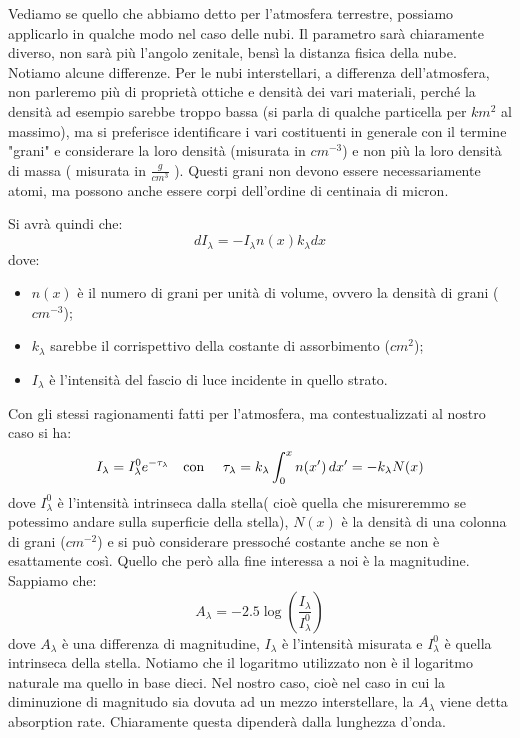 \documentclass[a4paper,11pt]{article}
\begin{document}
    Vediamo se quello che abbiamo detto per l'atmosfera terrestre, possiamo applicarlo in qualche modo nel caso delle nubi. Il parametro sarà chiaramente diverso, non sarà più l'angolo zenitale, bensì la distanza fisica della nube. 
    Notiamo alcune differenze. Per le nubi interstellari, a differenza dell'atmosfera, non parleremo più di proprietà ottiche e densità dei vari materiali, perché la densità ad esempio sarebbe troppo bassa (si parla di qualche particella per $km^2$ al massimo), ma si preferisce identificare i vari costituenti in generale con il termine "grani" e considerare la loro densità (misurata in $cm^{-3}$) e non più la loro densità di massa ( misurata in $ \frac{g}{cm^3} $ ). Questi grani non devono essere necessariamente atomi, ma possono anche essere corpi dell'ordine di centinaia di micron.
    
    Si avrà quindi che:
    $$
        dI_{\lambda} = -I_{\lambda} n(x) k_{\lambda} dx
    $$
    dove:
    \begin{itemize}
        \item $n(x)$ è il numero di grani per unità di volume, ovvero la densità di grani ($cm^{-3}$);
        \item $k_{\lambda}$ sarebbe il corrispettivo della costante di assorbimento ($cm^2$);
        \item $I_{\lambda}$ è l'intensità del fascio di luce incidente in quello strato.
    \end{itemize}
    
    Con gli stessi ragionamenti fatti per l'atmosfera, ma contestualizzati al nostro caso si ha:
    $$
        I_{\lambda} = I_{\lambda}^0 e^{-\tau_{\lambda}} \quad \hbox{con } \quad  \tau_{\lambda} = k_{\lambda} \int_0^x n(x') \, dx' = - k_{\lambda} N(x)
    $$
    dove $I_{\lambda}^0$ è l'intensità intrinseca dalla stella( cioè quella che misureremmo se potessimo andare sulla superficie della stella),  $N(x)$ è la densità di una colonna di grani ($cm^{-2}$) e si può considerare pressoché costante anche se non è esattamente così. Quello che però alla fine interessa a noi è la magnitudine. Sappiamo che: 
    $$
        A_{\lambda} = -2.5 \log \left( \frac{I_{\lambda}}{I_{\lambda}^0 } \right)
    $$
    dove $A_{\lambda}$ è una differenza di magnitudine, $I_{\lambda}$ è l'intensità misurata e $I_{\lambda}^0$ è quella intrinseca della stella. Notiamo che il logaritmo utilizzato non è il logaritmo naturale ma quello in base dieci. Nel nostro caso, cioè nel caso in cui la diminuzione di magnitudo sia dovuta ad un mezzo interstellare, la $A_{\lambda}$ viene detta absorption rate. Chiaramente questa dipenderà dalla lunghezza d'onda.
     
\end{document}
